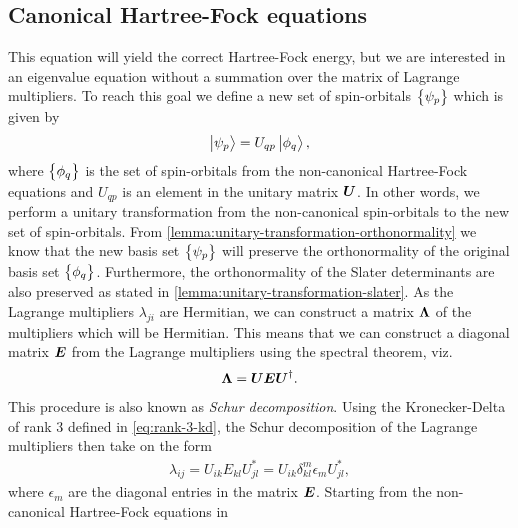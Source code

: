         \subsection{Canonical Hartree-Fock equations}
            This equation will yield the correct Hartree-Fock energy, but we are
            interested in an eigenvalue equation without a summation over the matrix
            of Lagrange multipliers.
            To reach this goal we define a new set of spin-orbitals
            $\left\{ \psi_p \right\}$ which is given by
            \begin{align}
                \ket{\psi_p} = U_{qp}\ket{\phi_q},
            \end{align}
            where $\left\{ \phi_q \right\}$ is the set of spin-orbitals from the non-canonical
            Hartree-Fock equations and $U_{qp}$ is an element in the unitary matrix
            $\boldsymbol{U}$.
            In other words, we perform a unitary transformation from the
            non-canonical spin-orbitals to the new set of spin-orbitals.
            From \autoref{lemma:unitary-transformation-orthonormality} we know
            that the new basis set $\left\{ \psi_{p} \right\}$ will preserve the
            orthonormality of the original basis set $\left\{ \phi_q \right\}$.
            Furthermore, the orthonormality of the Slater determinants are also
            preserved as stated in
            \autoref{lemma:unitary-transformation-slater}.
            As the Lagrange multipliers $\lambda_{ji}$ are Hermitian, we can
            construct a matrix $\boldsymbol{\Lambda}$ of the multipliers which will be
            Hermitian.
            This means that we can construct a diagonal matrix $\boldsymbol{E}$ from
            the Lagrange multipliers using the spectral theorem, viz.
            \begin{align}
                \boldsymbol{\Lambda} = \boldsymbol{U} \boldsymbol{E} \boldsymbol{U}^{\dagger}.
            \end{align}
            This procedure is also known as \emph{Schur decomposition}.
            Using the Kronecker-Delta of rank 3 defined in
            \autoref{eq:rank-3-kd}, the Schur decomposition of the Lagrange
            multipliers then take on the form
            \begin{align}
                \lambda_{ij} = U_{ik} E_{kl} U^{*}_{jl}
                = U_{ik} \delta^{m}_{kl} \epsilon_{m} U^{*}_{jl},
            \end{align}
            where $\epsilon_m$ are the diagonal entries in the matrix $\boldsymbol{E}$.
            Starting from the non-canonical Hartree-Fock equations in
